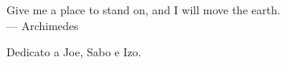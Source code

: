 \cleardoublepage
{}
\thispagestyle{empty}

\vspace*{3cm}

\begin{center}
    Give me a place to stand on, and I will move the earth. \\ \medskip
    --- Archimedes
\end{center}

\medskip

\begin{center}
    Dedicato a Joe, Sabo e Izo.
\end{center}
